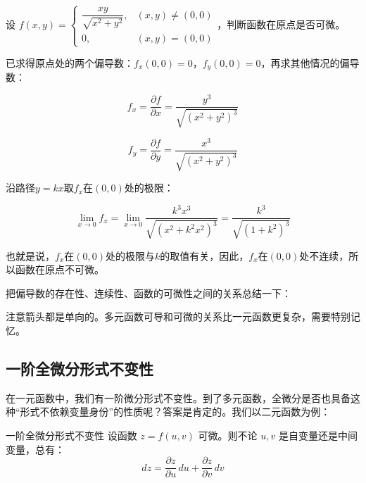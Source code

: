 \begin{myexample}
  设 $f(x, y) = \begin{cases}
    \dfrac{xy}{\sqrt{x^2 + y^2}}, & (x, y) \neq (0, 0) \\
    0, & (x, y) = (0, 0)
  \end{cases}$，判断函数在原点是否可微。

已求得原点处的两个偏导数：$f_x(0, 0) = 0$，$f_y(0, 0) = 0$，再求其他情况的偏导数：

\[f_x=\frac{\partial f}{\partial x}=\frac{y^3}{\sqrt{(x^2+y^2)^3}}\]

\[f_y=\frac{\partial f}{\partial y}=\frac{x^3}{\sqrt{(x^2+y^2)^3}}\]

沿路径$y=kx$取$f_x$在$(0,0)$处的极限：

\[\lim_{x \to 0} f_x =\lim_{x \to 0} \frac{k^3x^3}{\sqrt{(x^2+k^2x^2)^3}}=\frac{k^3}{\sqrt{(1+k^2)^3}}\]

也就是说，$f_x$在$(0,0)$处的极限与$k$的取值有关，因此，$f_x$在$(0,0)$处不连续，所以函数在原点不可微。
\end{myexample}

把偏导数的存在性、连续性、函数的可微性之间的关系总结一下：

\begin{center}
\end{center}

注意箭头都是单向的。多元函数可导和可微的关系比一元函数更复杂，需要特别记忆。

\subsection{一阶全微分形式不变性}

在一元函数中，我们有一阶微分形式不变性。到了多元函数，全微分是否也具备这种“形式不依赖变量身份”的性质呢？答案是肯定的。我们以二元函数为例：

\begin{theorem}{一阶全微分形式不变性}{}
设函数 $z = f(u, v)$ 可微。则不论 $u, v$ 是自变量还是中间变量，总有：
\[
dz = \frac{\partial z}{\partial u}\,du + \frac{\partial z}{\partial v}\,dv
\]
\end{theorem}

